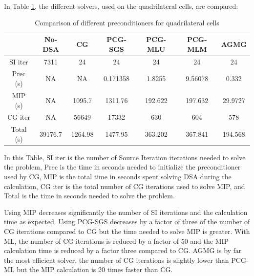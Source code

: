 In Table \ref{tab_1}, the different solvers, used on the quadrilateral cells, 
are compared:
\begin{table}[H]
\begin{center}
\caption{Comparison of different preconditioners for quadrilateral cells}
\begin{tabular}{|c|c|c|c|c|c|c|}
\hline
& No-DSA & CG & PCG-SGS &  PCG-MLU & PCG-MLM & AGMG\\
\hline
SI iter   & 7311    & 24      & 24       & 24      & 24      & 24      \\
Prec (s)  & NA      & NA      & 0.171358 & 1.8255  & 9.56078 & 0.332   \\
MIP (s)   & NA      & 1095.7  & 1311.76  & 192.622 & 197.632 & 29.9727 \\
CG iter   & NA      & 56649   & 17332    & 630     & 604     & 578     \\
Total (s) & 39176.7 & 1264.98 & 1477.95  & 363.202 & 367.841 & 194.568 \\
\hline
\end{tabular}
\label{tab_1}
\end{center}
\end{table}
In this Table, SI iter is the number of Source Iteration iterations 
needed to solve the problem, Prec is the time in seconds needed to
initialize the preconditioner used by CG, MIP is the total time in
seconds spent solving DSA during the calculation, CG iter is the total number 
of CG iterations used to solve MIP, and Total is the time in
seconds needed to solve the problem.

Using MIP decreases significantly the number of SI iterations and the
calculation time as expected. Using PCG-SGS decreases by a factor of three 
of the number of CG iterations compared to CG but the time needed to solve 
MIP is greater. With ML, the number of CG iterations is reduced by a factor 
of 50 and the MIP calculation time is reduced by a factor three compared to 
CG. AGMG is by far the most efficient solver, the number of CG iterations is 
slightly lower than PCG-ML but the MIP calculation is 20 times faster than CG.

